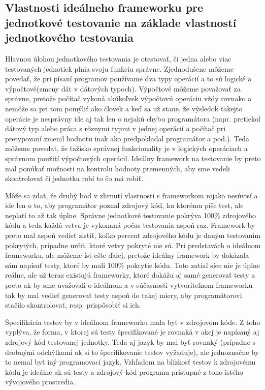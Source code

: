 \documentclass[11pt,twoside,slovak,a4paper]{article}
\begin{document}
	\subsection{Vlastnosti ideálneho frameworku pre jednotkové testovanie na základe vlastností jednotkového testovania}
	
		Hlavnou úlohou jednotkového testovania je otestovať, či jedna alebo viac testovaných jednotiek plnia svoju funkciu správne. Zjednodušene môžeme povedať, že pri písaní programov používame dva typy operácií a to sú logické a výpočtové(zmeny dát v dátových typoch). Výpočtové môžeme považovať za správne, pretože počítač vykoná akúkoľvek výpočtovú operáciu vždy rovnako a nemôže sa pri tom pomýliť ako človek a keď sa už stane, že výsledok takejto operácie je nesprávny ide aj tak len o nejakú chybu programátora (napr. pretiekol dátový typ alebo práca s rôznymi typmi v jednej operácií a počítač pri pretypovaní zmenil hodnotu inak ako predpokladal programátor a pod.). Teda môžeme povedať, že ťažisko správnej funkcionality je v logických operáciach a správnom použití výpočtových operácií. Ideálny framework na testovanie by preto mal ponúkať možnosti na kontrolu hodnoty premenných, aby sme vedeli skontrolovať či jednotka robí to čo má robiť.
		
		Môže sa zdať, že druhý bod v zhrnutí vlastností s frameworkom nijako nesúvisí a ide len o to, aby programátor poznal zdrojový kód, ku ktorému píše test, ale neplatí to až tak úplne. Správne jednotkové testovanie pokrýva 100\% zdrojového kódu a teda každá vetva je vykonaná počas testovania aspoň raz. Framework by preto mal aspoň vedieť zistiť, koľko percent zdrojového kódu je daným testovaním pokrytých, prípadne určiť, ktoré vetvy pokryté nie sú. Pri predstavách o ideálnom frameworku, ale môžeme ísť ešte ďalej, pretože ideálny framework by dokázala sám napísať testy, ktoré by mali 100\% pokrytie kódu. Toto zatiaľ síce nie je úplne reálne, ale už teraz existujú frameworky, ktoré dokážu aj samé generovať testy a preto ak by sme uvažovali o ideálnom a v súčasnosti vytvoriteľnom frameworku tak by mal vedieť generovať testy aspoň do takej miery, aby programátorovi stačilo skontrolovať, resp. prispôsobiť si ich.
		
		Špecifikácia testov by v ideálnom frameworku mala byť v zdrojovom kóde. Z toho vyplýva, že forma, v ktorej sú testy špecifikované je rovnaká v akej je napísaný aj zdrojový kód testovanej jednotky. Teda aj jazyk by mal byť rovnaký (prípadne s drobnými odchýlkami ak si to špecifikovanie testov vyžaduje), ale jednoznačne by to nemal byť iný programovací jazyk. Vzhľadom na blízkosť testov k zdrojovému kódu je ideálne ak sú testy a zdrojový kód programu prístupné z toho istého vývojového prostredia.
		
\end{document}
